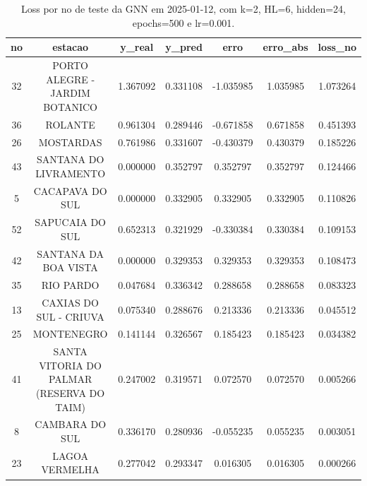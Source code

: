 \begin{table}[h]
\centering
\caption{Loss por no de teste da GNN em 2025-01-12, com k=2, HL=6, hidden=24, epochs=500 e lr=0.001.}
\label{tab:gnn_loss_k2_hl6_h24_e500_d20250112}
\begin{tabular}{ccccccc}
\toprule
no & estacao & y\_real & y\_pred & erro & erro\_abs & loss\_no \\
\midrule
32 & PORTO ALEGRE - JARDIM BOTANICO & 1.367092 & 0.331108 & -1.035985 & 1.035985 & 1.073264 \\
36 & ROLANTE & 0.961304 & 0.289446 & -0.671858 & 0.671858 & 0.451393 \\
26 & MOSTARDAS & 0.761986 & 0.331607 & -0.430379 & 0.430379 & 0.185226 \\
43 & SANTANA DO LIVRAMENTO & 0.000000 & 0.352797 & 0.352797 & 0.352797 & 0.124466 \\
5 & CACAPAVA DO SUL & 0.000000 & 0.332905 & 0.332905 & 0.332905 & 0.110826 \\
52 & SAPUCAIA DO SUL & 0.652313 & 0.321929 & -0.330384 & 0.330384 & 0.109153 \\
42 & SANTANA DA BOA VISTA & 0.000000 & 0.329353 & 0.329353 & 0.329353 & 0.108473 \\
35 & RIO PARDO & 0.047684 & 0.336342 & 0.288658 & 0.288658 & 0.083323 \\
13 & CAXIAS DO SUL - CRIUVA & 0.075340 & 0.288676 & 0.213336 & 0.213336 & 0.045512 \\
25 & MONTENEGRO & 0.141144 & 0.326567 & 0.185423 & 0.185423 & 0.034382 \\
41 & SANTA VITORIA DO PALMAR (RESERVA DO TAIM) & 0.247002 & 0.319571 & 0.072570 & 0.072570 & 0.005266 \\
8 & CAMBARA DO SUL & 0.336170 & 0.280936 & -0.055235 & 0.055235 & 0.003051 \\
23 & LAGOA VERMELHA & 0.277042 & 0.293347 & 0.016305 & 0.016305 & 0.000266 \\
\bottomrule
\end{tabular}
\end{table}
